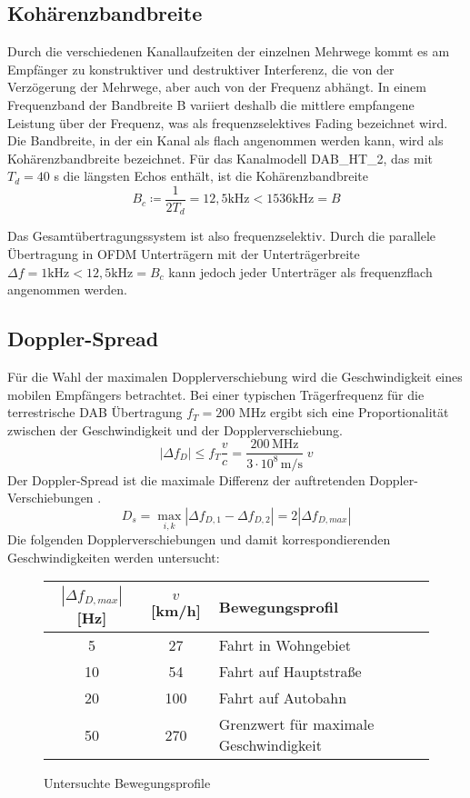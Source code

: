 \subsection{Kohärenzbandbreite}
Durch die verschiedenen Kanallaufzeiten der einzelnen Mehrwege kommt es am Empfänger zu konstruktiver und destruktiver Interferenz, die von der Verzögerung der Mehrwege, aber auch von der Frequenz abhängt. In einem Frequenzband der Bandbreite B variiert deshalb die mittlere empfangene Leistung über der Frequenz, was als frequenzselektives Fading bezeichnet wird. Die Bandbreite, in der ein Kanal als flach angenommen werden kann, wird als Kohärenzbandbreite bezeichnet. Für das Kanalmodell DAB\_HT\_2, das mit $T_d = 40$ \textmu s die längsten Echos enthält, ist die Kohärenzbandbreite
\begin{equation}
B_c \coloneqq \frac{1}{2 T_d} = 12,5 \text{kHz} < 1536 \text{kHz} = B
\end{equation}

Das Gesamtübertragungssystem ist also frequenzselektiv. Durch die parallele Übertragung in OFDM Unterträgern mit der Unterträgerbreite $\Delta f = 1 \text{kHz} < 12,5 \text{kHz} = B_c$ kann jedoch jeder Unterträger als frequenzflach angenommen werden.

\subsection{Doppler-Spread}
Für die Wahl der maximalen Dopplerverschiebung wird die Geschwindigkeit eines mobilen Empfängers betrachtet. Bei einer typischen Trägerfrequenz für die terrestrische DAB Übertragung $f_T=200$ MHz ergibt sich eine Proportionalität zwischen der Geschwindigkeit und der Dopplerverschiebung.
\begin{equation}
|\Delta f_{D}| \leq f_T \frac{v}{c} = \frac{200\, \text{MHz}}{3\cdot 10^8\, \text{m/s}}\; v
\end{equation}
Der Doppler-Spread ist die maximale Differenz der auftretenden Doppler-Verschiebungen \cite{proakis}.
\begin{equation}
D_s = \max_{i,k} |\Delta f_{D,1} - \Delta f_{D,2}| = 2 |\Delta f_{D,max}|
\end{equation}
Die folgenden Dopplerverschiebungen und damit korrespondierenden Geschwindigkeiten werden untersucht:

\begin{figure} [h]
\begin{center}
\begin{tabular}{c | c | l}
$|\Delta f_{D,max}|$ [Hz] & $v$ [km/h] & Bewegungsprofil \\
\hline
5 & 27 & Fahrt in Wohngebiet \\
10 & 54 & Fahrt auf Hauptstraße \\
20 & 100 & Fahrt auf Autobahn \\
50 & 270 & Grenzwert für maximale Geschwindigkeit
\end{tabular}
\caption{Untersuchte Bewegungsprofile}
\label{tab:doppler_werte}
\end{center}
\end{figure}

